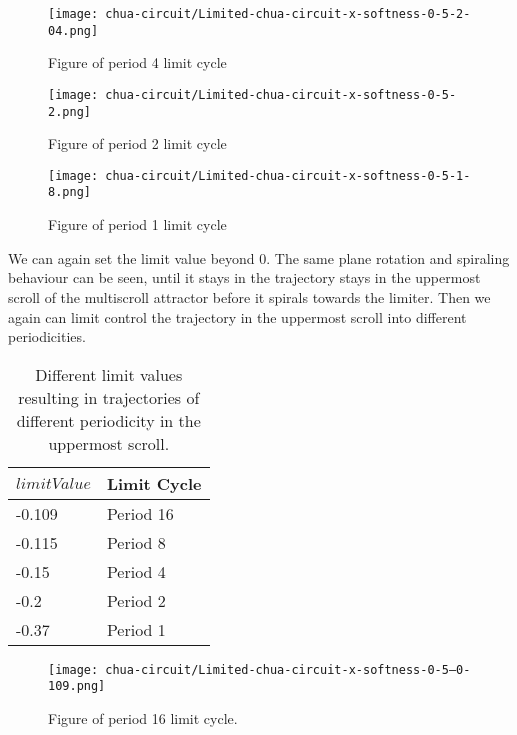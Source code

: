 \documentclass[main]{subfiles}
\begin{document}
\begin{figure}[H]
\centering
\texttt{[image: chua-circuit/Limited-chua-circuit-x-softness-0-5-2-04.png]}
\caption[Figure of period 4 limit cycle]{Figure of period 4 limit cycle}
\label{figure:x-0.5-4-limit-cycle-trajectory}
\end{figure}

\begin{figure}[H]
\centering
\texttt{[image: chua-circuit/Limited-chua-circuit-x-softness-0-5-2.png]}
\caption[Figure of period 3 limit cycle]{Figure of period 2 limit cycle}
\label{figure:x-0.5-2-limit-cycle-trajectory}
\end{figure}

\begin{figure}[H]
\centering
\texttt{[image: chua-circuit/Limited-chua-circuit-x-softness-0-5-1-8.png]}
\caption[Figure of period 1 limit cycle]{Figure of period 1 limit cycle}
\label{figure:x-0.5-1-limit-cycle-trajectory}
\end{figure}

We can again set the limit value beyond 0. The same plane rotation and spiraling behaviour can be seen, until it stays in the trajectory stays in the uppermost scroll of the multiscroll attractor before it spirals towards the limiter. Then we again can limit control the trajectory in the uppermost scroll into different periodicities.

\begin{table}[H]
\renewcommand{\arraystretch}{1.2}
\center
\begin{tabular}{@{}ll@{}}
	\toprule
   \(limitValue\) & Limit Cycle\\
   \midrule
   -0.109 & Period 16 \\
   -0.115 & Period 8 \\ 
   -0.15 & Period 4 \\
   -0.2  & Period 2 \\
   -0.37 & Period 1 \\
   \bottomrule
\end{tabular}
\caption[Limiter values for periodic trajectories for for an x self-limiting limiter with softness 0.13]{Different limit values resulting in trajectories of different periodicity in the uppermost scroll.}
\label{table:x-0.5-upperscroll-periodicities}
\end{table}

\begin{figure}[H]
\centering
\texttt{[image: chua-circuit/Limited-chua-circuit-x-softness-0-5--0-109.png]}
\caption[Figure of period 16 limit cycle]{Figure of period 16 limit cycle.}
\label{figure:x-0.5-16-limit-cycle-upperscroll-trajectory}
\end{figure}
\end{document}
